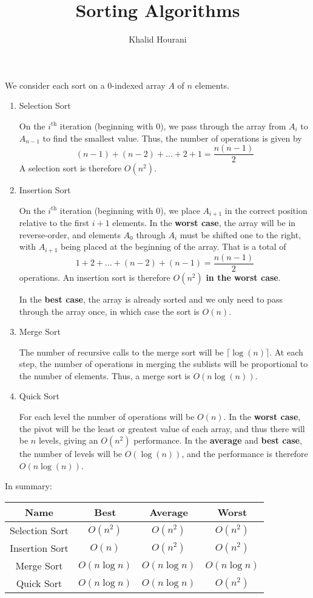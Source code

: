 \documentclass[a4paper]{article}
\title{Sorting Algorithms}
\author{Khalid Hourani}
\begin{document}
We consider each sort on a 0-indexed array $A$ of $n$ elements.
\begin{enumerate}
 \item Selection Sort
 
On the $i^{\text{th}}$ iteration (beginning with 0), we pass through the array from $A_i$ to $A_{n-1}$ to find the smallest value. Thus, the number of operations is given by \[(n-1)+(n-2)+\hdots+2+1=\frac{n(n-1)}{2}\] A selection sort is therefore $O(n^2)$.
 
 \item Insertion Sort
 
On the $i^{\text{th}}$ iteration (beginning with 0), we place $A_{i+1}$ in the correct position relative to the first $i+1$ elements. In the \textbf{worst case}, the array will be in reverse-order, and elements $A_0$ through $A_i$ must be shifted one to the right, with $A_{i+1}$ being placed at the beginning of the array. That is a total of \[1+2+\hdots+(n-2)+(n-1)=\frac{n(n-1)}{2}\] operations. An insertion sort is therefore $O(n^2)$ \textbf{in the worst case}.

In the \textbf{best case}, the array is already sorted and we only need to pass through the array once, in which case the sort is $O(n)$. 

 \item Merge Sort
 
 The number of recursive calls to the merge sort will be $\lceil\log(n)\rceil$. At each step, the number of operations in merging the sublists will be proportional to the number of elements. Thus, a merge sort is $O(n\log(n))$.
 
 \item Quick Sort
 
For each level the number of operations will be $O(n)$. In the \textbf{worst case}, the pivot will be the least or greatest value of each array, and thus there will be $n$ levels, giving an $O(n^2)$ performance. In the \textbf{average} and \textbf{best case}, the number of levels will be $O(\log(n))$, and the performance is therefore $O(n\log(n))$. 
\end{enumerate}

In summary: \begin{center}\begin{tabular}{|c|c|c|c|}\hline\textbf{Name} & \textbf{Best} & \textbf{Average} & \textbf{Worst}\\\hline Selection Sort & \cellcolor{red!50}$O(n^2)$ & \cellcolor{red!50}$O(n^2)$ & \cellcolor{red!50}$O(n^2)$\\\hline Insertion Sort & \cellcolor{red!25}$O(n)$ & \cellcolor{red!50}$O(n^2)$ & \cellcolor{red!50}$O(n^2)$\\\hline Merge Sort & \cellcolor{green!50}$O(n\log{n})$ & \cellcolor{green!50}$O(n\log{n})$ & \cellcolor{green!50}$O(n\log{n})$\\\hline Quick Sort & \cellcolor{green!50}$O(n\log{n})$ & \cellcolor{green!50}$O(n\log{n})$ & \cellcolor{red!50}$O(n^2)$\\\hline\end{tabular}\end{center}
\end{document}
